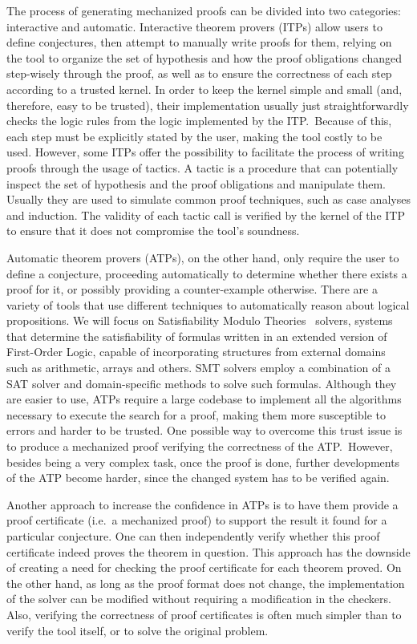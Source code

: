 The process of generating mechanized proofs can be divided
into two categories: interactive and automatic.
Interactive theorem provers (ITPs) allow users to define
conjectures, then attempt to manually write proofs for them,
relying on the tool to organize the set of hypothesis and
how the proof obligations changed step-wisely through the
proof, as well as to ensure the correctness of each step
according to a trusted kernel.
%
In order to keep the kernel simple and small (and, therefore,
easy to be trusted), their implementation usually just
straightforwardly checks the logic rules from the logic
implemented by the ITP.\ Because of this, each step must be
explicitly stated by the user, making the tool costly to be
used. However, some ITPs offer the possibility to facilitate
the process of writing proofs through the usage of tactics.
A tactic is a procedure that can potentially inspect the
set of hypothesis and the proof obligations and manipulate
them. Usually they are used to simulate common proof
techniques, such as case analyses and induction. The
validity of each tactic call is verified by the kernel
of the ITP to ensure that it does not compromise the tool's
soundness.

Automatic theorem provers (ATPs), on the other hand,
only require the user to define a conjecture, proceeding
automatically to determine whether there exists a proof
for it, or possibly providing a counter-example otherwise.
%
There are a variety of tools that use different
techniques to automatically reason about logical propositions.
We will focus on Satisfiability Modulo Theories~\cite[ch. 33]{handbook} solvers, systems
that determine the satisfiability of formulas written in an
extended version of First-Order Logic,
capable of incorporating structures from external domains such as arithmetic,
arrays and others. SMT solvers employ a combination of a SAT solver and
domain-specific methods to solve such formulas.
%
Although they are easier to use, ATPs require a large
codebase to implement all the algorithms necessary to execute
the search for a proof, making them more susceptible to
errors and harder to be trusted. One possible way to overcome
this trust issue is to produce a mechanized proof verifying
the correctness of the ATP.\ However, besides being a very
complex task, once the proof is done, further developments of
the ATP become harder, since the changed system has to be
verified again.

Another approach to increase the confidence in ATPs is to have them provide a
proof certificate (i.e.\ a mechanized proof) to support the result it found for a particular conjecture.
One can then independently verify whether this proof certificate indeed proves the theorem in question.
This approach has the downside of creating a need
for checking the proof certificate for each theorem proved.
On the other hand, as long as the proof format does not change, the implementation
of the solver can be modified without requiring a modification in the checkers. Also,
verifying the correctness of proof certificates is often much simpler than to verify
the tool itself, or to solve the original problem.

